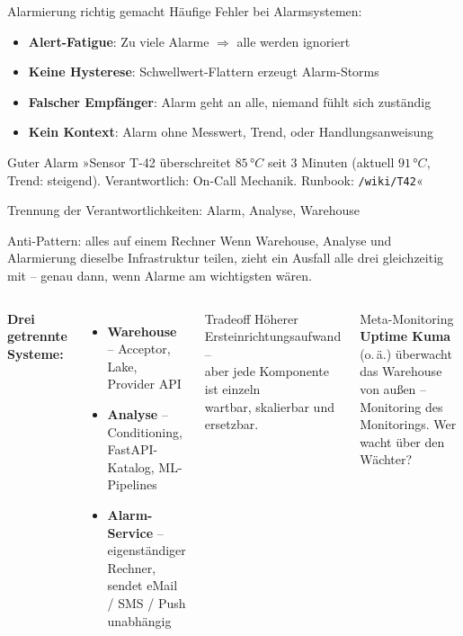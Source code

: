 \documentclass[aspectratio=169]{beamer}
\begin{document}
\begin{frame}{Alarmierung richtig gemacht}
  Häufige Fehler bei Alarmsystemen:
  \begin{itemize}
    \item \textbf{Alert-Fatigue}: Zu viele Alarme $\Rightarrow$ alle werden ignoriert
    \item \textbf{Keine Hysterese}: Schwellwert-Flattern erzeugt Alarm-Storms
    \item \textbf{Falscher Empfänger}: Alarm geht an alle, niemand fühlt sich zuständig
    \item \textbf{Kein Kontext}: Alarm ohne Messwert, Trend, oder Handlungsanweisung
  \end{itemize}
  \vspace{0.5em}
  \begin{exampleblock}{Guter Alarm}
    »Sensor T-42 überschreitet $85\,°C$ seit 3 Minuten (aktuell $91\,°C$,
    Trend: steigend). Verantwortlich: On-Call Mechanik. Runbook: \texttt{/wiki/T42}«
  \end{exampleblock}
\end{frame}

\begin{frame}{Trennung der Verantwortlichkeiten: Alarm, Analyse, Warehouse}
  \begin{alertblock}{Anti-Pattern: alles auf einem Rechner}
    Wenn Warehouse, Analyse und Alarmierung dieselbe Infrastruktur teilen,
    zieht ein Ausfall alle drei gleichzeitig mit – genau dann, wenn
    Alarme am wichtigsten wären.
  \end{alertblock}
  \vspace{0.5em}
  \begin{columns}
      \textbf{Drei getrennte Systeme:}
      \begin{itemize}
        \item \textbf{Warehouse} – Acceptor, Lake, Provider API
        \item \textbf{Analyse} – Conditioning, FastAPI-Katalog,
              ML-Pipelines
        \item \textbf{Alarm-Service} – eigenständiger Rechner,
              sendet eMail / SMS / Push unabhängig
      \end{itemize}
      \begin{block}{Tradeoff}
        Höherer Ersteinrichtungsaufwand –\\
        aber jede Komponente ist einzeln\\
        wartbar, skalierbar und ersetzbar.
      \end{block}
      \begin{exampleblock}{Meta-Monitoring}
        \textbf{Uptime Kuma} (o.\,ä.) überwacht
        das Warehouse von außen –
        Monitoring des Monitorings.
        Wer wacht über den Wächter?
      \end{exampleblock}
  \end{columns}
\end{frame}
\end{document}
